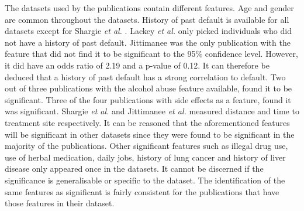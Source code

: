\documentclass{sig-alternate-05-2015}
\begin{document}
	The datasets used by the publications contain different features. Age and gender are common throughout the datasets. History of past default is available for all datasets except for Shargie \textit{et al.} \cite{Shargie:10.1371/journal.pmed.0040037}. Lackey \textit{et al.} \cite{Lackey:10356751520150601} only picked individuals who did not have a history of past default. Jittimanee \cite{jittimanee:10.1111/j.1440-172X.2007.00650.x} was the only publication with the feature that did not find it to be significant to the 95\% confidence level. However, it did have an odds ratio of 2.19 and a p-value of 0.12. It can therefore be deduced that a history of past default has a strong correlation to default. Two out of three publications with the alcohol abuse feature available, found it to be significant. Three of the four publications with side effects as a feature, found it was significant. Shargie \textit{et al.} \cite{Shargie:10.1371/journal.pmed.0040037} and Jittimanee \textit{et al.} \cite{jittimanee:10.1111/j.1440-172X.2007.00650.x} measured distance and time to treatment site respectively. It can be reasoned that the aforementioned features will be significant in other datasets since they were found to be significant in the majority of the publications. Other significant features such as illegal drug use, use of herbal medication, daily jobs, history of lung cancer and history of liver disease only appeared once in the datasets. It cannot be discerned if the significance is generalisable or specific to the dataset. The identification of the same features as significant is fairly consistent for the publications that have those features in their dataset. 
\end{document}
